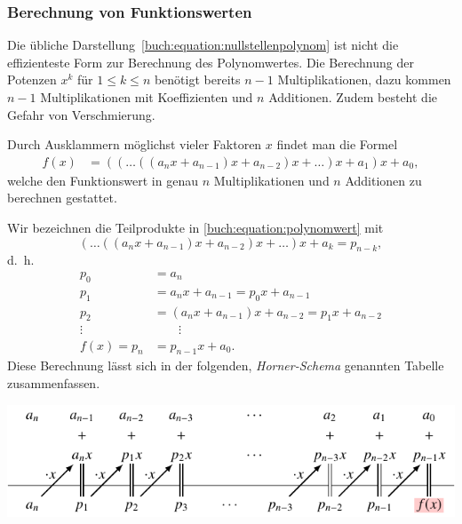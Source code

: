 \subsubsection{Berechnung von Funktionswerten}
Die übliche Darstellung~\eqref{buch:equation:nullstellenpolynom}
ist nicht die effizienteste Form zur Berechnung des Polynomwertes.
Die Berechnung der Potenzen $x^k$ für $1\le k\le n$ benötigt bereits
$n-1$ Multiplikationen, dazu kommen $n-1$ Multiplikationen mit
Koeffizienten und $n$ Additionen.
Zudem besteht die Gefahr von Verschmierung.

Durch Ausklammern möglichst vieler Faktoren $x$ findet man die
Formel
\begin{align}
f(x)
&=
((\dots((a_nx+a_{n-1})x+a_{n-2})x+\dots)x+a_1)x+a_0,
\label{buch:equation:polynomwert}
\end{align}
welche den Funktionswert in genau $n$ Multiplikationen und $n$ Additionen
zu berechnen gestattet.

Wir bezeichnen die Teilprodukte in \eqref{buch:equation:polynomwert}
mit
\[
(\dots((a_nx+a_{n-1})x+a_{n-2})x+\dots)x+a_k
=
p_{n-k},
\]
d.~h.
\begin{equation}
\begin{aligned}
p_0 &= a_n
\\
p_1 &= a_nx+a_{n-1} = p_0x + a_{n-1}
\\
p_2 &= (a_nx+a_{n-1})x+a_{n-2} = p_1x+a_{n-2}
\\
\vdots\;&\qquad\vdots
\\
f(x)
=
p_n
&=
p_{n-1}x+a_0.
\end{aligned}
\label{buch:equation:reste}
\end{equation}
Diese Berechnung lässt sich in der folgenden, {\em Horner-Schema}
genannten Tabelle
zusammenfassen.
\begin{center}
\includegraphics{chapters/20-gleichungen/figures/horner1.pdf}
\end{center}

